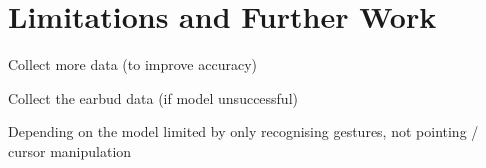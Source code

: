 \section{Limitations and Further Work} %
Collect more data (to improve accuracy)

Collect the earbud data (if model unsuccessful)



Depending on the model limited by only recognising gestures, not pointing / cursor manipulation


